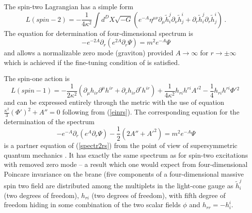 \documentclass[a4paper,12pt]{article}
\begin{document}
The spin-two Lagrangian has a simple form
\begin{equation}
 L(spin-2)= -\frac{1}{4\kappa^2}\int d^D X \sqrt{-G}
\left(e^{-A}\eta^{\mu\nu}\partial_\mu\tilde h_i^j\partial_{\nu}\tilde
h^i_j  + \partial_r \tilde h_i^j \partial_r
\tilde h_j^i\right)~.
 \label{spin2rs}
\end{equation}
The equation for determination of four-dimensional spectrum is
\begin{equation}
-e^{-2A}\partial_r\left(e^{2A}\partial_r\Psi\right)=m^2e^{-A}\Psi
\label{spectr2rs}
\end{equation}
and allows a normalizable zero mode (graviton) provided $A \to \infty$
for $r \to \pm \infty$ which is achieved if the fine-tuning condition
of \cite{Randall:1999vf} is satisfied.

The spin-one action is
 \begin{equation}
L(spin-1) =
 -\frac{1}{2\kappa^2}\left(\partial_\mu h_{ir}\partial^\mu
 h^{ir} + \partial_r h_{ir}\partial^r h^{ir} \right)
 + \frac{1}{4\kappa^2} h_{ri} h^{ri}{A'}^2
  - \frac{1}{4} h_{r i} h^{ri} \Phi'{^2}~
 \label{spin1rs}
\end{equation}
and can be expressed entirely through the metric with the use of
equation $\frac{\kappa^2}{3}(\Phi')^2 +A''=0$ following from (\ref{einrs}).
The corresponding equation for the determination of the spectrum
\begin{equation}
-e^{-A}\partial_r\left(e^{A}\partial_r\Psi\right)-
\frac{1}{2}\left(2A'' +{A'}^2\right)=m^2e^{-A}\Psi
\label{spectr1}
\end{equation}
is a partner equation of (\ref{spectr2rs}) from the point of view of
supersymmetric quantum mechanics \cite{Cooper:1994eh}. It has exactly
the same spectrum as for spin-two excitations with removed zero mode
-- a result which one would expect from four-dimensional Poincare
invariance on the brane (five components of a four-dimensional
massive spin two field are distributed among the multiplets in the
light-cone gauge as $\tilde h_i^j$ (two degrees of freedom), $h_{ri}$
(two degrees of freedom), with fifth degree of freedom hiding in some
combination of the two scalar fields $\phi$ and $h_{rr}=-h^i_i$.
\end{document}

